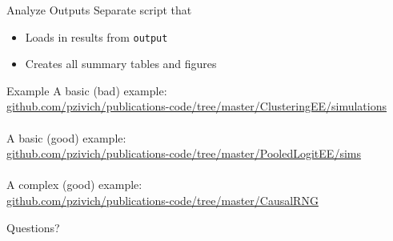 \documentclass[aspectratio=169]{beamer}
\begin{document}
\begin{frame}{Analyze Outputs}
	Separate script that
	\begin{itemize}
		\item Loads in results from \texttt{output}
		\item Creates all summary tables and figures
	\end{itemize} 
\end{frame}

\begin{frame}{Example}
	A basic (bad) example: \\
	\url{github.com/pzivich/publications-code/tree/master/ClusteringEE/simulations}
	~\\~\\
	A basic (good) example: \\
	\url{github.com/pzivich/publications-code/tree/master/PooledLogitEE/sims}
	~\\~\\
	A complex (good) example: \\
	\url{github.com/pzivich/publications-code/tree/master/CausalRNG}
\end{frame}

\begin{frame}{Questions?}
	~
\end{frame}
\end{document}
